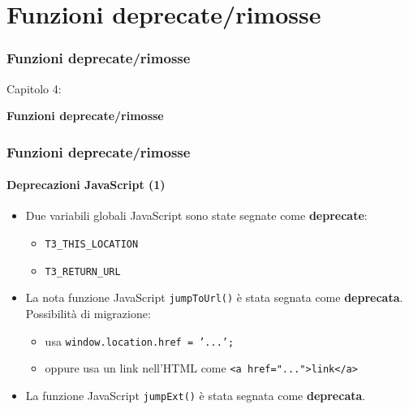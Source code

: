 %

\section{Funzioni deprecate/rimosse}
\begin{frame}[fragile]
	\frametitle{Funzioni deprecate/rimosse}

	\begin{center}\huge{Capitolo 4:}\end{center}
	\begin{center}\huge{\color{typo3darkgrey}\textbf{Funzioni deprecate/rimosse}}\end{center}

\end{frame}


\begin{frame}[fragile]
	\frametitle{Funzioni deprecate/rimosse}
	\framesubtitle{Deprecazioni JavaScript (1)}

	\begin{itemize}
		\item Due variabili globali JavaScript sono state segnate come \textbf{deprecate}:

			\begin{itemize}
				\item \texttt{T3\_THIS\_LOCATION}
				\item \texttt{T3\_RETURN\_URL}
			\end{itemize}

		\item La nota funzione JavaScript \texttt{jumpToUrl()} è stata segnata come \textbf{deprecata}.
			Possibilità di migrazione:

			\begin{itemize}
				\item usa \texttt{window.location.href = '...';}
				\item oppure usa un link nell'HTML come \texttt{<a href="...">link</a>}
			\end{itemize}

		\item La funzione JavaScript \texttt{jumpExt()} è stata segnata come \textbf{deprecata}.

	\end{itemize}

\end{frame}


